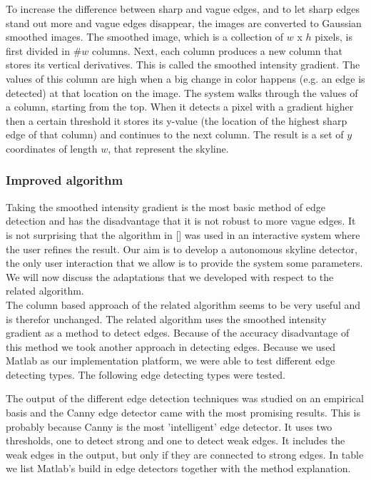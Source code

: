 To increase the difference between sharp and vague edges, and to let sharp edges
stand out more and vague edges disappear, the images are converted to Gaussian
smoothed images.  The smoothed image, which is a collection of $w$ x $h$ pixels,
is first divided in \#$w$ columns.  Next, each column produces a new column that
stores its vertical derivatives. This is called the smoothed intensity gradient.
The values of this column are high when a big change in color happens (e.g. an
edge is detected) at that location on the image. 
The system walks through the values of a column, starting from the top.  When it
detects a pixel with a gradient higher then a certain threshold it stores its
y-value (the location of the highest sharp edge of that column) and continues
to the next column.  The result is a set of $y$ coordinates of length $w$, that
represent the skyline. 

\subsubsection{Improved algorithm}
Taking the smoothed intensity gradient is the most basic method of edge
detection and has the disadvantage that it is not robust to more vague edges. It
is not surprising that the algorithm in []%
was used in an interactive system
where the user refines the result. 
Our aim is to develop a autonomous skyline detector, the only user interaction
that we allow is to provide the system some parameters. We will now discuss
the adaptations that we developed with respect to the related algorithm.\\

The column based approach of the related algorithm seems to be very useful and is
therefor unchanged.  The related algorithm uses the smoothed intensity gradient
as a method to detect edges. 
Because of the accuracy disadvantage of this method we took another approach in
detecting edges. Because we used Matlab as our implementation platform, we were
able to test different edge detecting types. The following edge detecting types
were tested.


The output of the different edge detection techniques was studied on an empirical
basis and the Canny edge detector came with the most promising results. This is
probably because Canny is the most 'intelligent' edge detector.  It uses two
thresholds, one to detect strong and one to detect weak edges. It includes the weak edges in the
output, but only if they are connected to strong edges. In table %
we list Matlab's build in edge detectors together with the method explanation.


